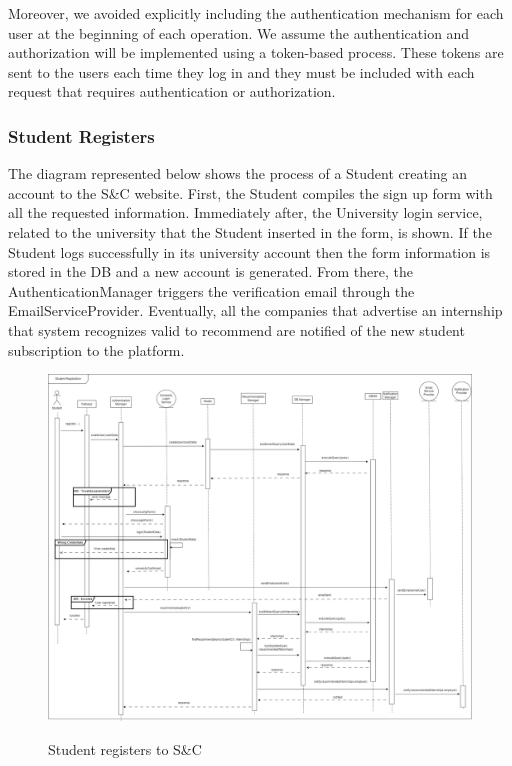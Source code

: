 \documentclass[a4paper,12pt]{article}
\begin{document}
Moreover, we avoided explicitly including the authentication mechanism for each user at the beginning of each operation. We assume the authentication and authorization will be implemented using a token-based process. These tokens are sent to the users each time they log in and they must be included with each request that requires authentication or authorization.
\subsubsection*{Student Registers}
The diagram represented below shows the process of a Student creating an account to the S\&C website. First, the Student compiles the sign up form with all the requested information. Immediately after, the University login service, related to the university that the Student inserted in the form, is shown. If the Student logs successfully in its university account then the form information is stored in the DB and a new account is generated. From there, the AuthenticationManager triggers the verification email through the EmailServiceProvider. Eventually, all the companies that advertise an internship that system recognizes valid to recommend are notified of the new student subscription to the platform.
\begin{figure}[H]
\centering
\includegraphics[scale = 0.28]{DD_figures/RuntimeView/StudentRegistrationRV.drawio.png}\\
\caption{Student registers to S\&C}
\end{figure}
\end{document}
